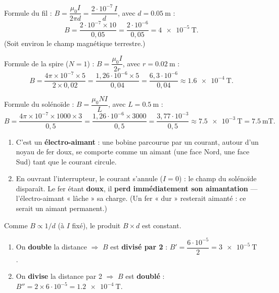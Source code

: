 \documentclass[11pt,a4paper]{article}
\begin{document}
\begin{corrige}
Formule du fil : $B=\dfrac{\mu_0 I}{2\pi d}=\dfrac{2\cdot10^{-7}\,I}{d}$, avec $d=\qty{0.05}{\metre}$ :
\[ B=\frac{2\cdot10^{-7}\times10}{0{,}05}=\frac{2\cdot10^{-6}}{0{,}05}=\qty{4e-5}{\tesla}. \]
(Soit environ le champ magnétique terrestre.)
\end{corrige}

\begin{corrige}
Formule de la spire ($N=1$) : $B=\dfrac{\mu_0 I}{2r}$, avec $r=\qty{0.02}{\metre}$ :
\[ B=\frac{4\pi\times10^{-7}\times5}{2\times0{,}02}
    =\frac{1{,}26\cdot10^{-6}\times5}{0{,}04}
    =\frac{6{,}3\cdot10^{-6}}{0{,}04}\approx\qty{1.6e-4}{\tesla}. \]
\end{corrige}

\begin{corrige}
Formule du solénoïde : $B=\dfrac{\mu_0 N I}{L}$, avec $L=\qty{0.5}{\metre}$ :
\[ B=\frac{4\pi\times10^{-7}\times1000\times3}{0{,}5}
    =\frac{1{,}26\cdot10^{-6}\times3000}{0{,}5}
    =\frac{3{,}77\cdot10^{-3}}{0{,}5}\approx\qty{7.5e-3}{\tesla}=\qty{7.5}{\milli\tesla}. \]
\end{corrige}

\begin{corrige}
\begin{enumerate}[label=\alph*)]
  \item C'est un \textbf{électro-aimant} : une bobine parcourue par un courant, autour d'un noyau de
        fer doux, se comporte comme un aimant (une face Nord, une face Sud) tant que le courant circule.
  \item En ouvrant l'interrupteur, le courant s'annule ($I=0$) : le champ du solénoïde disparaît. Le
        fer étant \textbf{doux}, il \textbf{perd immédiatement son aimantation} — l'électro-aimant
        « lâche » sa charge. (Un fer « dur » resterait aimanté : ce serait un aimant permanent.)
\end{enumerate}
\end{corrige}

\begin{corrige}[la décroissance en $1/d$]
Comme $B\propto 1/d$ (à $I$ fixé), le produit $B\times d$ est constant.
\begin{enumerate}[label=\alph*)]
  \item On \textbf{double} la distance $\Rightarrow$ $B$ est \textbf{divisé par 2} :
        $B'=\dfrac{6\cdot10^{-5}}{2}=\qty{3e-5}{\tesla}$.
  \item On \textbf{divise} la distance par 2 $\Rightarrow$ $B$ est \textbf{doublé} :
        $B''=2\times6\cdot10^{-5}=\qty{1.2e-4}{\tesla}$.
\end{enumerate}
\end{corrige}
\end{document}
